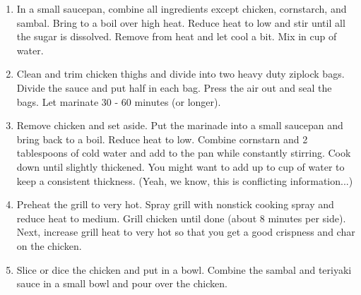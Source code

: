 \documentclass{article}
\begin{document}
\begin{enumerate}
      \item In a small saucepan, combine all ingredients except chicken, cornstarch, and sambal.
            Bring to a boil over high heat. Reduce heat to low and stir until all the sugar is
            dissolved. Remove from heat and let cool a bit. Mix in  cup of water.

      \item Clean and trim chicken thighs and divide into two heavy duty ziplock bags. Divide the
            sauce and put half in each bag. Press the air out and seal the bags. Let marinate 30 - 60
            minutes (or longer).

      \item Remove chicken and set aside. Put the marinade into a small saucepan and bring back
            to a boil. Reduce heat to low. Combine cornstarn and 2 tablespoons of cold water and
            add to the pan while constantly stirring. Cook down until slightly thickened. You might
            want to add up to  cup of water to keep a consistent thickness. (Yeah, we know, this
            is conflicting information...)

      \item Preheat the grill to very hot. Spray grill with nonstick cooking spray and reduce
            heat to medium. Grill chicken until done (about 8 minutes per side). Next, increase grill
            heat to very hot so that you get a good crispness and char on the chicken.

      \item Slice or dice the chicken and put in a bowl. Combine the sambal and teriyaki sauce in
            a small bowl and pour over the chicken.
\end{enumerate}

\end{document}
